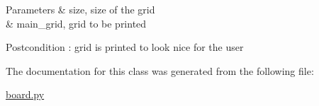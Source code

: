 \begin{DoxyParams}{Parameters}
{\em } & size, size of the grid \\
\hline
{\em } & main\+\_\+grid, grid to be printed \\
\hline
\end{DoxyParams}
\begin{DoxyPostcond}{Postcondition}
\+: grid is printed to look nice for the user 
\end{DoxyPostcond}


The documentation for this class was generated from the following file\+:\begin{DoxyCompactItemize}
\item 
\mbox{\hyperlink{board_8py}{board.\+py}}\end{DoxyCompactItemize}

